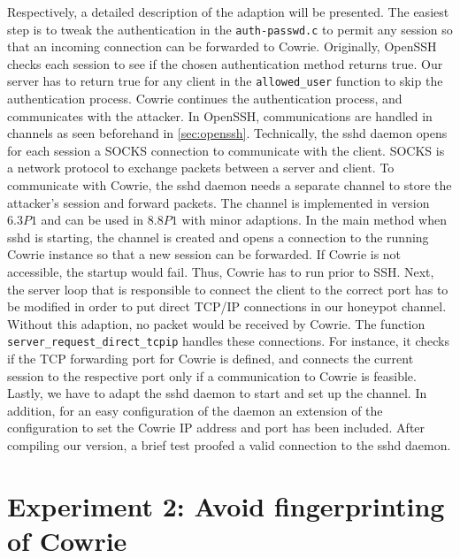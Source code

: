 Respectively, a detailed description of the adaption will be presented.
The easiest step is to tweak the authentication in the \verb|auth-passwd.c| to permit any session so that an incoming connection can be forwarded to Cowrie.
Originally, OpenSSH checks each session to see if the chosen authentication method returns true.
Our server has to return true for any client in the \verb|allowed_user| function to skip the authentication process.
Cowrie continues the authentication process, and communicates with the attacker.
In OpenSSH, communications are handled in channels as seen beforehand in \autoref{sec:openssh}.
Technically, the sshd daemon opens for each session a SOCKS connection to communicate with the client.
SOCKS is a network protocol to exchange packets between a server and client.
To communicate with Cowrie, the sshd daemon needs a separate channel to store the attacker's session and forward packets.
The channel is implemented in version $6.3P1$ and can be used in $8.8P1$ with minor adaptions.
In the main method when sshd is starting, the channel is created and opens a connection to the running Cowrie instance so that a new session can be forwarded.
If Cowrie is not accessible, the startup would fail.
Thus, Cowrie has to run prior to SSH.
Next, the server loop that is responsible to connect the client to the correct port has to be modified in order to put direct TCP/IP connections in our honeypot channel.
Without this adaption, no packet would be received by Cowrie.
The function \verb|server_request_direct_tcpip| handles these connections.
For instance, it checks if the TCP forwarding port for Cowrie is defined, and connects the current session to the respective port only if a communication to Cowrie is feasible.
Lastly, we have to adapt the sshd daemon to start and set up the channel.
In addition, for an easy configuration of the daemon an extension of the configuration to set the Cowrie IP address and port has been included.
After compiling our version, a brief test proofed a valid connection to the sshd daemon.

\section{Experiment 2: Avoid fingerprinting of Cowrie}


